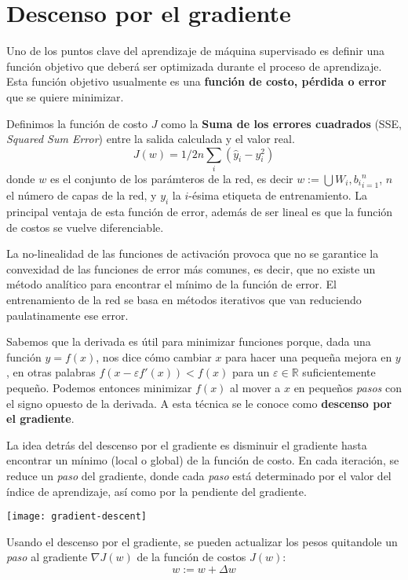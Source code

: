\blindtext
\section{Descenso por el gradiente}
Uno de los puntos clave del aprendizaje de máquina supervisado es
definir una función objetivo que deberá ser optimizada durante el
proceso de aprendizaje. Esta función objetivo usualmente es una
\textbf{función de costo, pérdida o error} que se quiere minimizar.

Definimos la función de costo $J$ como la \textbf{Suma de los errores
  cuadrados} (SSE, \textit{Squared Sum Error}) entre la salida
  calculada y el valor real.
\begin{equation}
  J(w)=1/2n \sum_i (\hat{y}_i - y_i^2)
\end{equation}
donde $w$ es el conjunto de los parámteros de la red, es decir $w :=
\bigcup{W_i, b_i}_{i=1}^{n}$, $n$ el número de capas de la red, y
$y_i$ la $i$-ésima etiqueta de entrenamiento. La principal ventaja de
esta función de error, además de ser lineal es que la función de
costos se vuelve diferenciable.

La no-linealidad de las funciones de activación provoca que no se
garantice la convexidad de las funciones de error más comunes, es
decir, que no existe un método analítico para encontrar el mínimo de
la función de error. El entrenamiento de la red se basa en métodos
iterativos que van reduciendo paulatinamente ese error.

Sabemos que la derivada es útil para minimizar funciones porque, dada
una función $y = f(x)$, nos dice cómo cambiar $x$ para hacer una
pequeña mejora en $y$, en otras palabras $f(x-\varepsilon f'(x)) <
f(x)$ para un $\varepsilon \in \mathbb{R}$ suficientemente
pequeño. Podemos entonces minimizar $f(x)$ al mover a $x$ en pequeños
\textit{pasos} con el signo opuesto de la derivada. A esta técnica se
le conoce como \textbf{descenso por el gradiente}.

La idea detrás del descenso por el gradiente es disminuir el gradiente hasta encontrar
un mínimo (local o global) de la función de costo. En cada iteración, se reduce
un \textit{paso} del gradiente, donde cada \textit{paso} está determinado por
el valor del índice de aprendizaje, así como por la pendiente del gradiente.

\texttt{[image: gradient-descent]}

Usando el descenso por el gradiente, se pueden actualizar los pesos quitandole un \textit{paso}
al gradiente $\nabla J(w)$ de la función de costos $J(w)$:
\begin{equation}
  w := w + \Delta w
\end{equation}

